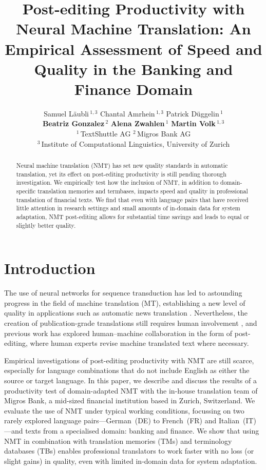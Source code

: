 \documentclass[11pt]{article}
\title{Post-editing Productivity with Neural Machine Translation: An Empirical Assessment of Speed and Quality in the Banking and Finance Domain}
\author{}
\author{Samuel Läubli\,$^{1,3}$ 
    \quad Chantal Amrhein\,$^{1,3}$
    \quad Patrick Düggelin\,$^1$\medskip\\
    \quad \textbf{Beatriz Gonzalez\,$^2$}
    \quad \textbf{Alena Zwahlen\,$^1$}
    \quad \textbf{Martin Volk\,$^{1,3}$} \bigskip\\
    $^1$\,TextShuttle AG \quad
    $^2$\,Migros Bank AG\medskip\\
    $^3$\,Institute of Computational Linguistics, University of Zurich}
\date{}
\begin{document}
\maketitle
\begin{abstract}
  Neural machine translation (NMT) has set new quality standards in automatic translation, yet its effect on post-editing productivity is still pending thorough investigation. We empirically test how the inclusion of NMT, in addition to domain-specific translation memories and termbases, impacts speed and quality in professional translation of financial texts. We find that even with language pairs that have received little attention in research settings and small amounts of in-domain data for system adaptation, NMT post-editing allows for substantial time savings and leads to equal or slightly better quality.
\end{abstract}

\section{Introduction}
\label{sec:Introduction}

The use of neural networks for sequence transduction \citep{KalchbrennerBlunsom2013,Sutskever2014,Bahdanau2015} has led to astounding progress in the field of machine translation (MT), establishing a new level of quality in applications such as automatic news translation \citep{Sennrich2016,Hassan2018}. Nevertheless, the creation of publication-grade translations still requires human involvement \citep{Laeubli2018,Toral2018}, and previous work has explored human--machine collaboration in the form of post-editing, where human experts revise machine translated text where necessary.

Empirical investigations of post-editing productivity with NMT are still scarce, especially for language combinations that do not include English as either the source or target language. In this paper, we describe and discuss the results of a productivity test of domain-adapted NMT with the in-house translation team of Migros Bank, a mid-sized financial institution based in Zurich, Switzerland. We evaluate the use of NMT under typical working conditions, focussing on two rarely explored language pairs---German~(DE) to French~(FR) and Italian~(IT)---and texts from a specialised domain: banking and finance. We show that using NMT in combination with translation memories (TMs) and terminology databases (TBs) enables professional translators to work faster with no loss (or slight gains) in quality, even with limited in-domain data for system adaptation.
\end{document}
